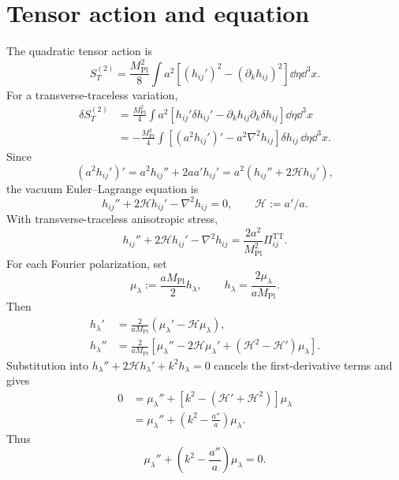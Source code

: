 \section{Tensor action and equation}
The quadratic tensor action is
\begin{equation}
\boxed{
S_T^{(2)}
=\frac{M_{\mathrm{Pl}}^2}{8}
\int a^2
\left[
(h_{ij}')^2-(\partial_kh_{ij})^2
\right]
\dd\eta\dd^3x.
}
\end{equation}
For a transverse-traceless variation,
\begin{align}
\delta S_T^{(2)}
&=\frac{M_{\mathrm{Pl}}^2}{4}
\int a^2
\left[
h_{ij}'\delta h_{ij}'
-\partial_kh_{ij}\partial_k\delta h_{ij}
\right]\dd\eta\dd^3x\\
&=-\frac{M_{\mathrm{Pl}}^2}{4}
\int
\left[
(a^2h_{ij}')'-a^2\nabla^2h_{ij}
\right]
\delta h_{ij}\,\dd\eta\dd^3x.
\end{align}
Since
\begin{equation}
(a^2h_{ij}')'
=a^2h_{ij}''+2aa'h_{ij}'
=a^2(h_{ij}''+2\mathcal Hh_{ij}'),
\end{equation}
the vacuum Euler--Lagrange equation is
\begin{equation}
\boxed{
h_{ij}''+2\mathcal Hh_{ij}'-\nabla^2h_{ij}=0,
\qquad
\mathcal H:=a'/a.
}
\end{equation}
With transverse-traceless anisotropic stress,
\begin{equation}
h_{ij}''+2\mathcal Hh_{ij}'-\nabla^2h_{ij}
=\frac{2a^2}{M_{\mathrm{Pl}}^2}\Pi_{ij}^{\mathrm{TT}}.
\end{equation}
For each Fourier polarization, set
\begin{equation}
\mu_\lambda:=\frac{aM_{\mathrm{Pl}}}{2}h_\lambda,
\qquad
h_\lambda=\frac{2\mu_\lambda}{aM_{\mathrm{Pl}}}.
\end{equation}
Then
\begin{align}
h_\lambda'
&=\frac{2}{aM_{\mathrm{Pl}}}
(\mu_\lambda'-\mathcal H\mu_\lambda),\\
h_\lambda''
&=\frac{2}{aM_{\mathrm{Pl}}}
\left[
\mu_\lambda''-2\mathcal H\mu_\lambda'
+(\mathcal H^2-\mathcal H')\mu_\lambda
\right].
\end{align}
Substitution into
\(h_\lambda''+2\mathcal Hh_\lambda'+k^2h_\lambda=0\)
cancels the first-derivative terms and gives
\begin{align}
0
&=\mu_\lambda''+
\left[k^2-(\mathcal H'+\mathcal H^2)\right]\mu_\lambda\\
&=\mu_\lambda''+
\left(k^2-\frac{a''}{a}\right)\mu_\lambda.
\end{align}
Thus
\begin{equation}
\boxed{
\mu_\lambda''+
\left(k^2-\frac{a''}{a}\right)\mu_\lambda=0.
}
\end{equation}


